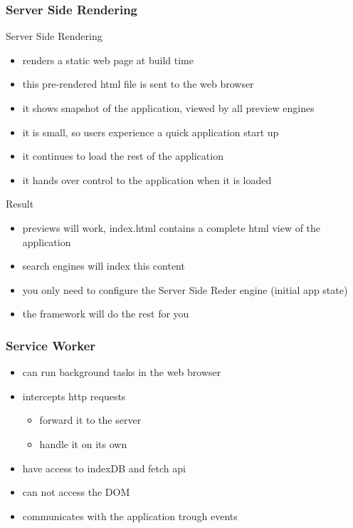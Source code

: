 \begin{frame}[fragile] \frametitle{Server Side Rendering}
Server Side Rendering
\begin{itemize}
  \item renders a static web page at build time
  \item this pre-rendered html file is sent to the web browser
  \item it shows snapshot of the application, viewed by all preview engines
  \item it is small, so users experience a quick application start up
  \item it continues to load the rest of the application
  \item it hands over control to the application when it is loaded
\end{itemize}
Result
\begin{itemize}
  \item previews will work, index.html contains a complete html view of the application
  \item search engines will index this content
  \item you only need to configure the Server Side Reder engine (initial app state)
  \item the framework will do the rest for you
\end{itemize}
\end{frame}

\begin{frame}[fragile] \frametitle{Service Worker}
\begin{itemize}
  \item can run background tasks in the web browser
  \item intercepts http requests
  \begin{itemize}
    \item forward it to the server
    \item handle it on its own
  \end{itemize}
  \item have access to indexDB and fetch api
  \item can not access the DOM
  \item communicates with the application trough events
\end{itemize}
\end{frame}

